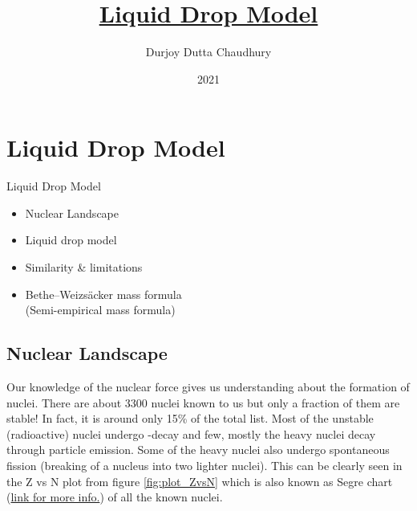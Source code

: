 \documentclass[ebook,12pt,oneside,openany]{memoir}
\title{\underline{\textbf{Liquid Drop Model}}}
\author{Durjoy Dutta Chaudhury}
\date{2021}
\begin{document}
\maketitle

\pagebreak

\tableofcontents
\listoffigures
\listoftables




\chapter{Liquid Drop Model} 
 
     \begin{tcolorbox} [title = \textbf{Key Objectives:}, width = \textwidth]
    Liquid Drop Model
    \begin{itemize}
        \item Nuclear Landscape
        \item Liquid drop model
        \item Similarity \& limitations
        \item Bethe–Weizsäcker mass formula \\ (Semi-empirical mass formula) 
    \end{itemize}
    \end{tcolorbox}
 
    \section{Nuclear Landscape}
    Our knowledge of the nuclear force gives us understanding about the formation of nuclei. There are about 3300 nuclei known to us but only a fraction of them are stable! In fact, it is around only 15\% of the total list. Most of the unstable (radioactive) nuclei undergo -decay and few, mostly the heavy nuclei decay through  particle emission. Some of the heavy nuclei also undergo spontaneous fission (breaking of a nucleus into two lighter nuclei). This can be clearly seen in the Z vs N plot from figure \ref{fig:plot_ZvsN} which is also known as Segre chart (\href{https://www.nndc.bnl.gov/nudat2/}{link for more info.}) of all the known nuclei.
    
\end{document}
